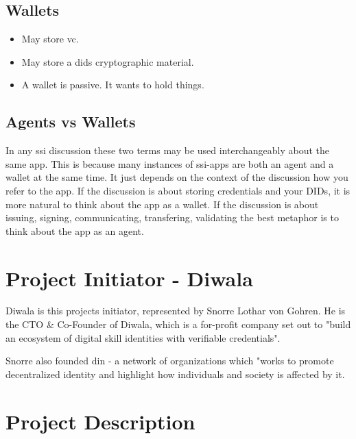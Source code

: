 \subsection{Wallets}

\begin{itemize}
    \item May store \acrfull{vc}.
    \item May store a \acrshort{did}s cryptographic material.
    \item A wallet is passive. It wants to hold things.
\end{itemize}

\subsection{Agents vs Wallets}

In any \acrshort{ssi} discussion these two terms may be used interchangeably about the same app. This is because many instances of \acrshort{ssi}-apps are both an agent and a wallet at the same time. It just depends on the context of the discussion how you refer to the app. If the discussion is about storing credentials and your DIDs, it is more natural to think about the app as a wallet. If the discussion is about issuing, signing, communicating, transfering, validating the best metaphor is to think about the app as an agent.



\newpage

\section{Project Initiator - Diwala}

Diwala is this projects initiator, represented by Snorre Lothar von Gohren. He is the CTO \& Co-Founder of Diwala, which is a for-profit company set out to "build an ecosystem of digital skill identities with verifiable credentials"\cite{DiwalaAbout}.

Snorre also founded \acrfull{din} - a network of organizations which "works to promote decentralized identity and highlight how individuals and society is affected by it.

\section{Project Description}

